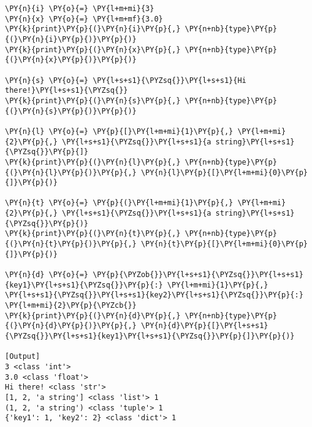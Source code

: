 \begin{Verbatim}[label=\makebox{\url{https://bitbucket.org/lbaldini/programming/src/tip/snippets/basic\_types.py}},commandchars=\\\{\}]
\PY{n}{i} \PY{o}{=} \PY{l+m+mi}{3}
\PY{n}{x} \PY{o}{=} \PY{l+m+mf}{3.0}
\PY{k}{print}\PY{p}{(}\PY{n}{i}\PY{p}{,} \PY{n+nb}{type}\PY{p}{(}\PY{n}{i}\PY{p}{)}\PY{p}{)}
\PY{k}{print}\PY{p}{(}\PY{n}{x}\PY{p}{,} \PY{n+nb}{type}\PY{p}{(}\PY{n}{x}\PY{p}{)}\PY{p}{)}

\PY{n}{s} \PY{o}{=} \PY{l+s+s1}{\PYZsq{}}\PY{l+s+s1}{Hi there!}\PY{l+s+s1}{\PYZsq{}}
\PY{k}{print}\PY{p}{(}\PY{n}{s}\PY{p}{,} \PY{n+nb}{type}\PY{p}{(}\PY{n}{s}\PY{p}{)}\PY{p}{)}

\PY{n}{l} \PY{o}{=} \PY{p}{[}\PY{l+m+mi}{1}\PY{p}{,} \PY{l+m+mi}{2}\PY{p}{,} \PY{l+s+s1}{\PYZsq{}}\PY{l+s+s1}{a string}\PY{l+s+s1}{\PYZsq{}}\PY{p}{]}
\PY{k}{print}\PY{p}{(}\PY{n}{l}\PY{p}{,} \PY{n+nb}{type}\PY{p}{(}\PY{n}{l}\PY{p}{)}\PY{p}{,} \PY{n}{l}\PY{p}{[}\PY{l+m+mi}{0}\PY{p}{]}\PY{p}{)}

\PY{n}{t} \PY{o}{=} \PY{p}{(}\PY{l+m+mi}{1}\PY{p}{,} \PY{l+m+mi}{2}\PY{p}{,} \PY{l+s+s1}{\PYZsq{}}\PY{l+s+s1}{a string}\PY{l+s+s1}{\PYZsq{}}\PY{p}{)}
\PY{k}{print}\PY{p}{(}\PY{n}{t}\PY{p}{,} \PY{n+nb}{type}\PY{p}{(}\PY{n}{t}\PY{p}{)}\PY{p}{,} \PY{n}{t}\PY{p}{[}\PY{l+m+mi}{0}\PY{p}{]}\PY{p}{)}

\PY{n}{d} \PY{o}{=} \PY{p}{\PYZob{}}\PY{l+s+s1}{\PYZsq{}}\PY{l+s+s1}{key1}\PY{l+s+s1}{\PYZsq{}}\PY{p}{:} \PY{l+m+mi}{1}\PY{p}{,} \PY{l+s+s1}{\PYZsq{}}\PY{l+s+s1}{key2}\PY{l+s+s1}{\PYZsq{}}\PY{p}{:} \PY{l+m+mi}{2}\PY{p}{\PYZcb{}}
\PY{k}{print}\PY{p}{(}\PY{n}{d}\PY{p}{,} \PY{n+nb}{type}\PY{p}{(}\PY{n}{d}\PY{p}{)}\PY{p}{,} \PY{n}{d}\PY{p}{[}\PY{l+s+s1}{\PYZsq{}}\PY{l+s+s1}{key1}\PY{l+s+s1}{\PYZsq{}}\PY{p}{]}\PY{p}{)}

[Output]
3 <class 'int'>
3.0 <class 'float'>
Hi there! <class 'str'>
[1, 2, 'a string'] <class 'list'> 1
(1, 2, 'a string') <class 'tuple'> 1
{'key1': 1, 'key2': 2} <class 'dict'> 1
\end{Verbatim}